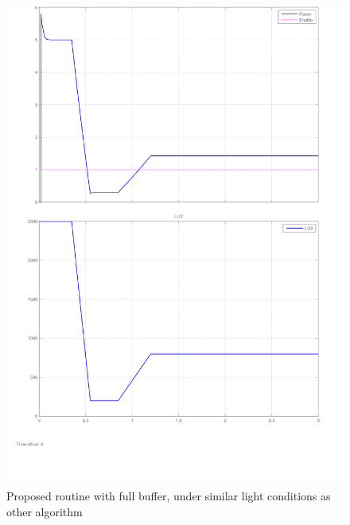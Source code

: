   
   \begin{figure}[H]
  	  \begin{center}
  		  \includegraphics[width=\textwidth]{images/Proposed_algo-1}
  		  \caption{Proposed routine with full buffer, under similar light conditions as other algorithm}
  		  \label{fig:Frac_oc_result}
  	  \end{center}
    \end{figure}



